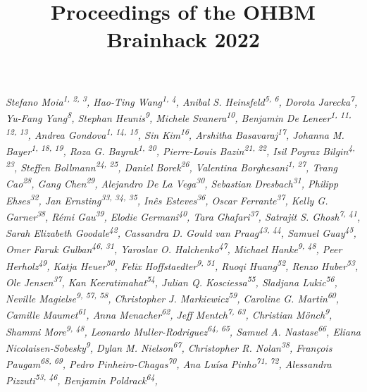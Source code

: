 \documentclass[12pt,a4paper,onecolumn]{article}
\author{}\date{}
\title{Proceedings of the OHBM Brainhack 2022}
\newcommand{\authors}[1]{\emph{\scriptsize #1} \\}
\begin{document}
\authors{Stefano Moia\textsuperscript{1, 2, 3}, %
Hao-Ting Wang\textsuperscript{1, 4}, %
Anibal S. Heinsfeld\textsuperscript{5, 6}, %
Dorota Jarecka\textsuperscript{7}, %
Yu-Fang Yang\textsuperscript{8}, %
Stephan Heunis\textsuperscript{9}, %
Michele Svanera\textsuperscript{10}, %
Benjamin De Leneer\textsuperscript{1, 11, 12, 13}, %
Andrea Gondova\textsuperscript{1, 14, 15}, %
Sin Kim\textsuperscript{16}, %
Arshitha Basavaraj\textsuperscript{17}, %
Johanna M. Bayer\textsuperscript{1, 18, 19}, %
Roza G. Bayrak\textsuperscript{1, 20}, %
Pierre-Louis Bazin\textsuperscript{21, 22}, %
Isil Poyraz Bilgin\textsuperscript{4, 23}, %
Steffen Bollmann\textsuperscript{24, 25}, %
Daniel Borek\textsuperscript{26}, %
Valentina Borghesani\textsuperscript{1, 27}, %
Trang Cao\textsuperscript{28}, %
Gang Chen\textsuperscript{29}, %
Alejandro De La Vega\textsuperscript{30}, %
Sebastian Dresbach\textsuperscript{31}, %
Philipp Ehses\textsuperscript{32}, %
Jan Ernsting\textsuperscript{33, 34, 35}, %
Inês Esteves\textsuperscript{36}, %
Oscar Ferrante\textsuperscript{37}, %
Kelly G. Garner\textsuperscript{38}, %
Rémi Gau\textsuperscript{39}, %
Elodie Germani\textsuperscript{40}, %
Tara Ghafari\textsuperscript{37}, %
Satrajit S. Ghosh\textsuperscript{7, 41}, %
Sarah Elizabeth Goodale\textsuperscript{42}, %
Cassandra D. Gould van Praag\textsuperscript{43, 44}, %
Samuel Guay\textsuperscript{45}, %
Omer Faruk Gulban\textsuperscript{46, 31}, %
Yaroslav O. Halchenko\textsuperscript{47}, %
Michael Hanke\textsuperscript{9, 48}, %
Peer Herholz\textsuperscript{49}, %
Katja Heuer\textsuperscript{50}, %
Felix Hoffstaedter\textsuperscript{9, 51}, %
Ruoqi Huang\textsuperscript{52}, %
Renzo Huber\textsuperscript{53}, %
Ole Jensen\textsuperscript{37}, %
Kan Keeratimahat\textsuperscript{54}, %
Julian Q. Kosciessa\textsuperscript{55}, %
Sladjana Lukic\textsuperscript{56}, %
Neville Magielse\textsuperscript{9, 57, 58}, %
Christopher J. Markiewicz\textsuperscript{59}, %
Caroline G. Martin\textsuperscript{60}, %
Camille Maumet\textsuperscript{61}, %
Anna Menacher\textsuperscript{62}, %
Jeff Mentch\textsuperscript{7, 63}, %
Christian Mönch\textsuperscript{9}, %
Shammi More\textsuperscript{9, 48}, %
Leonardo Muller-Rodriguez\textsuperscript{64, 65}, %
Samuel A. Nastase\textsuperscript{66}, %
Eliana Nicolaisen-Sobesky\textsuperscript{9}, %
Dylan M. Nielson\textsuperscript{67}, %
Christopher R. Nolan\textsuperscript{38}, %
François Paugam\textsuperscript{68, 69}, %
Pedro Pinheiro-Chagas\textsuperscript{70}, %
Ana Luísa Pinho\textsuperscript{71, 72}, %
Alessandra Pizzuti\textsuperscript{53, 46}, %
Benjamin Poldrack\textsuperscript{64}, %
}
\end{document}
